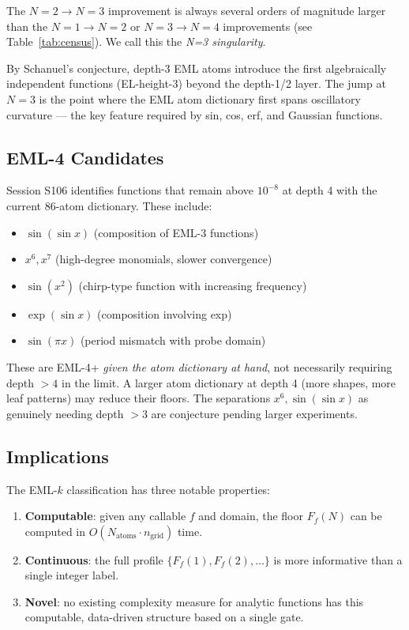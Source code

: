 The $N=2 \to N=3$ improvement is always several orders of magnitude
larger than the $N=1 \to N=2$ or $N=3 \to N=4$ improvements
(see Table~\ref{tab:census}). We call this the \emph{N=3 singularity}.

\begin{remark}
By Schanuel's conjecture, depth-3 EML atoms introduce the first
algebraically independent functions (EL-height-3) beyond the depth-1/2
layer.  The jump at $N=3$ is the point where the EML atom dictionary
first spans oscillatory curvature --- the key feature required by
sin, cos, erf, and Gaussian functions.
\end{remark}

\subsection{EML-4 Candidates}

Session S106 identifies functions that remain above $10^{-8}$ at depth 4
with the current 86-atom dictionary. These include:
\begin{itemize}
  \item $\sin(\sin x)$ (composition of EML-3 functions)
  \item $x^6, x^7$ (high-degree monomials, slower convergence)
  \item $\sin(x^2)$ (chirp-type function with increasing frequency)
  \item $\exp(\sin x)$ (composition involving exp)
  \item $\sin(\pi x)$ (period mismatch with probe domain)
\end{itemize}

These are EML-4+ \emph{given the atom dictionary at hand}, not necessarily
requiring depth $> 4$ in the limit.  A larger atom dictionary at depth 4
(more shapes, more leaf patterns) may reduce their floors.
The separations $x^6, \sin(\sin x)$ as genuinely needing depth $> 3$
are conjecture pending larger experiments.

\subsection{Implications}

The EML-$k$ classification has three notable properties:
\begin{enumerate}
  \item \textbf{Computable}: given any callable $f$ and domain, the floor
    $F_f(N)$ can be computed in $O(N_\mathrm{atoms} \cdot n_\mathrm{grid})$ time.
  \item \textbf{Continuous}: the full profile $\{F_f(1), F_f(2), \ldots\}$
    is more informative than a single integer label.
  \item \textbf{Novel}: no existing complexity measure for analytic functions
    has this computable, data-driven structure based on a single gate.
\end{enumerate}
